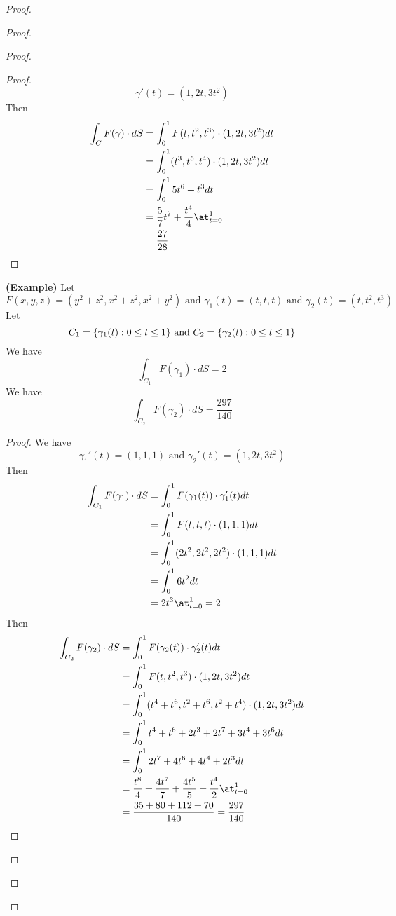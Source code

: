 \documentclass{report}
\begin{document}
\begin{proof}
\begin{proof}
\begin{proof}
\begin{proof}
\begin{equation}
\gamma '(t)=(1,2t,3t^2)
\end{equation}
Then
\begin{align}
\int_{C} F(\gamma )\cdot dS&= \int_0^1 F(t,t^2,t^3)\cdot (1,2t,3t^2) dt\\
&=\int_0^1 (t^3,t^5,t^4)\cdot (1,2t,3t^2)dt\\
&=\int_0^1 5t^6+t^3 dt\\
&=\frac{5}{7}t^7+\frac{t^4}{4}\at_{t=0}^1\\
&=\frac{27}{28}
\end{align}
\end{proof}
\begin{theorem}
\label{7.1.11}
\textbf{(Example)} Let
\begin{equation}
F(x,y,z)=(y^2+z^2,x^2+z^2,x^2+y^2)\text{ and }\gamma_1 (t)=(t,t,t)\text{ and }\gamma _2 (t)=(t,t^2,t^3)
\end{equation}
Let
\begin{equation}
C_1=\{ \gamma _1(t):0\leq t\leq 1 \}\text{ and }C_2=\{ \gamma _2(t):0\leq t\leq 1 \}
\end{equation}
We have
\begin{equation}
\int_{C_1}F(\gamma_1 )\cdot dS=2
\end{equation}
We have
\begin{equation}
\int_{C_2}F(\gamma _2)\cdot dS=\frac{297}{140}
\end{equation}
\end{theorem}
\begin{proof}
We have
\begin{equation}
\gamma _1'(t)=(1,1,1)\text{ and }\gamma _2'(t)=(1,2t,3t^2)
\end{equation}
Then
\begin{align}
\int_{C_1}F(\gamma _1)\cdot dS&=\int_0^1 F(\gamma _1(t))\cdot \gamma _1'(t)dt\\
&=\int_0^1 F(t,t,t)\cdot (1,1,1)dt\\
&=\int_0^1 (2t^2,2t^2,2t^2)\cdot (1,1,1)dt\\
&=\int_0^1 6t^2 dt\\
&=2t^3\at_{t=0}^1=2
\end{align}
Then 
\begin{align}
\int_{C_2}F(\gamma _2)\cdot dS&=\int_0^1 F(\gamma _2(t))\cdot \gamma _2'(t)dt\\
&=\int_0^1 F(t,t^2,t^3)\cdot (1,2t,3t^2)dt\\
&=\int_0^1 (t^4+t^6,t^2+t^6,t^2+t^4)\cdot (1,2t,3t^2)dt\\
&=\int_0^1 t^4+t^6+2t^3+2t^7+3t^4+3t^6dt\\
&=\int_0^1 2t^7+4t^6+4t^4 +2t^3dt\\
&=\frac{t^8}{4}+\frac{4t^7}{7}+\frac{4t^5}{5}+\frac{t^4}{2}\at_{t=0}^1\\
&=\frac{35+80+112+70}{140}=\frac{297}{140}
\end{align}
\end{proof}

\end{proof}
\end{proof}
\end{proof}
\end{document}
